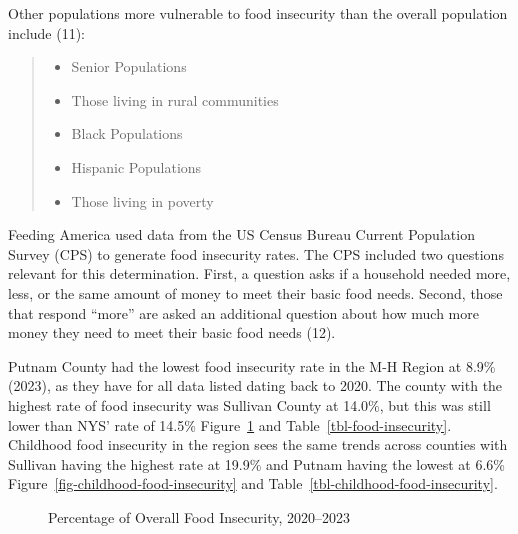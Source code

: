 \documentclass[
  english,
  letterpaper,
]{report}
\providecommand{\tightlist}{%
  \setlength{\itemsep}{0pt}\setlength{\parskip}{0pt}}
\begin{document}
Other populations more vulnerable to food insecurity than the overall
population include (11):

\begin{quote}
\begin{itemize}
\tightlist
\item
  Senior Populations
\item
  Those living in rural communities
\item
  Black Populations
\item
  Hispanic Populations
\item
  Those living in poverty
\end{itemize}
\end{quote}

Feeding America used data from the US Census Bureau Current Population
Survey (CPS) to generate food insecurity rates. The CPS included two
questions relevant for this determination. First, a question asks if a
household needed more, less, or the same amount of money to meet their
basic food needs. Second, those that respond ``more'' are asked an
additional question about how much more money they need to meet their
basic food needs (12).

Putnam County had the lowest food insecurity rate in the M-H Region at
8.9\% (2023), as they have for all data listed dating back to 2020. The
county with the highest rate of food insecurity was Sullivan County at
14.0\%, but this was still lower than NYS' rate of 14.5\%
Figure~\ref{fig-food-insecurity} and Table~\ref{tbl-food-insecurity}.
Childhood food insecurity in the region sees the same trends across
counties with Sullivan having the highest rate at 19.9\% and Putnam
having the lowest at 6.6\% Figure~\ref{fig-childhood-food-insecurity}
and Table~\ref{tbl-childhood-food-insecurity}.

\begin{figure}


\caption{\label{fig-food-insecurity}Percentage of Overall Food
Insecurity, 2020--2023}

\end{figure}%
\end{document}
